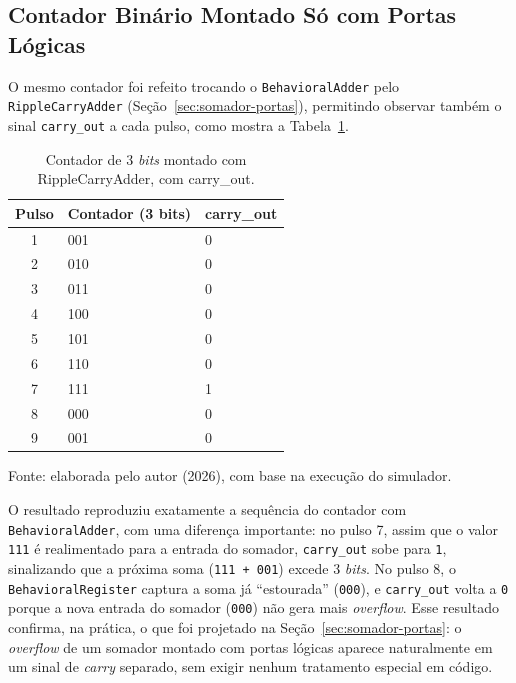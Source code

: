 \subsection{Contador Binário Montado Só com Portas Lógicas}
\label{sec:contador-portas}

O mesmo contador foi refeito trocando o \texttt{BehavioralAdder} pelo \texttt{RippleCarryAdder} (Seção~\ref{sec:somador-portas}), permitindo observar também o sinal \texttt{carry\_out} a cada pulso, como mostra a Tabela~\ref{tab:contador-portas}.

\begin{table}[H]
\centering
\caption{Contador de 3 \textit{bits} montado com RippleCarryAdder, com carry\_out.}
\label{tab:contador-portas}
\begin{tabular}{c|l|l}
\hline
\textbf{Pulso} & \textbf{Contador (3 bits)} & \textbf{carry\_out} \\
\hline
1 & 001 & 0 \\
2 & 010 & 0 \\
3 & 011 & 0 \\
4 & 100 & 0 \\
5 & 101 & 0 \\
6 & 110 & 0 \\
7 & 111 & 1 \\
8 & 000 & 0 \\
9 & 001 & 0 \\
\hline
\end{tabular}
\begin{center}
\footnotesize Fonte: elaborada pelo autor (2026), com base na execução do simulador.
\end{center}
\end{table}

O resultado reproduziu exatamente a sequência do contador com \texttt{BehavioralAdder}, com uma diferença importante: no pulso 7, assim que o valor \texttt{111} é realimentado para a entrada do somador, \texttt{carry\_out} sobe para \texttt{1}, sinalizando que a próxima soma (\texttt{111 + 001}) excede 3 \textit{bits}. No pulso 8, o \texttt{BehavioralRegister} captura a soma já ``estourada'' (\texttt{000}), e \texttt{carry\_out} volta a \texttt{0} porque a nova entrada do somador (\texttt{000}) não gera mais \textit{overflow}. Esse resultado confirma, na prática, o que foi projetado na Seção~\ref{sec:somador-portas}: o \textit{overflow} de um somador montado com portas lógicas aparece naturalmente em um sinal de \textit{carry} separado, sem exigir nenhum tratamento especial em código.

